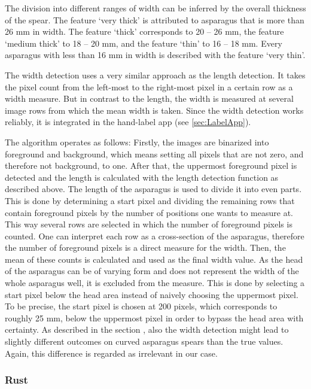 \bigskip
The division into different ranges of width can be inferred by the overall thickness of the spear. The feature ‘very thick’ is attributed to asparagus that is more than 26 mm in width. The feature ‘thick’ corresponds to 20 -- 26 mm, the feature ‘medium thick’ to 18 -- 20 mm, and the feature ‘thin’ to 16 -- 18 mm. Every asparagus with less than 16 mm in width is described with the feature ‘very thin’.

\bigskip
The width detection uses a very similar approach as the length detection. It takes the pixel count from the left-most to the right-most pixel in a certain row as a width measure. But in contrast to the length, the width is measured at several image rows from which the mean width is taken. Since the width detection works reliably, it is integrated in the hand-label app (see \autoref{sec:LabelApp}).

The algorithm operates as follows: Firstly, the images are binarized into foreground and background, which means setting all pixels that are not zero, and therefore not background, to one. After that, the uppermost foreground pixel is detected and the length is calculated with the length detection function as described above. The length of the asparagus is used to divide it into even parts. This is done by determining a start pixel and dividing the remaining rows that contain foreground pixels by the number of positions one wants to measure at. This way several rows are selected in which the number of foreground pixels is counted. One can interpret each row as a cross-section of the asparagus, therefore the number of foreground pixels is a direct measure for the width. Then, the mean of these counts is calculated and used as the final width value. As the head of the asparagus can be of varying form and does not represent the width of the whole asparagus well, it is excluded from the measure. This is done by selecting a start pixel below the head area instead of naively choosing the uppermost pixel. To be precise, the start pixel is chosen at 200 pixels, which corresponds to roughly 25 mm, below the uppermost pixel in order to bypass the head area with certainty. As described in the section , also the width detection might lead to slightly different outcomes on curved asparagus spears than the true values. Again, this difference is regarded as irrelevant in our case.


\subsubsection{Rust}
\label{subsec:Rust}

